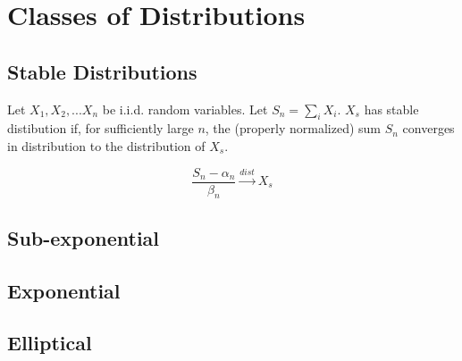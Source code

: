\section{Classes of Distributions}

\subsection{Stable Distributions}

Let $X_1,X_2,...X_n$ be i.i.d. random variables. Let $S_n = \sum_i X_i$. $X_s$ has stable distibution if, for sufficiently large $n$, the (properly normalized) sum $S_n$ converges in distribution to the distribution of $X_s$.

\begin{equation}
\frac{S_n-\alpha_n}{\beta_n} \xrightarrow{dist} X_s
\end{equation}


\subsection{Sub-exponential}

\subsection{Exponential}


\subsection{Elliptical}

